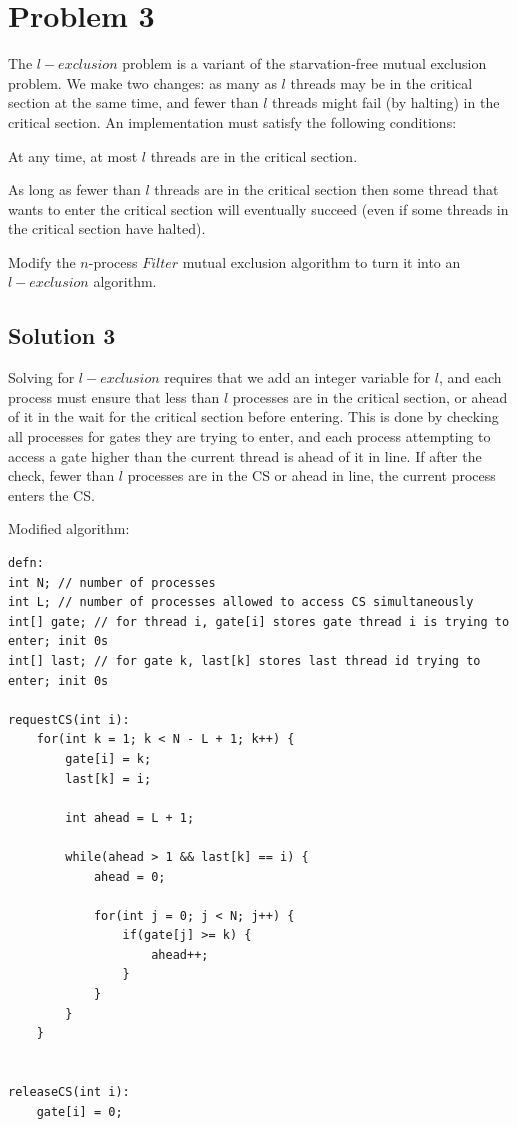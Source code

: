 \documentclass{article}
\begin{document}
\pagebreak
\section{Problem 3}
The $l-exclusion$ problem is a variant of the starvation-free mutual exclusion problem. We make two changes: as many as $l$ threads may be in the critical section at the same time, and fewer than $l$ threads might fail (by halting) in the critical section. An implementation must satisfy the following conditions:

\begin{description}[font=\scshape\bfseries]
\item [$l-Exclusion$:] At any time, at most $l$ threads are in the critical section.
\item [$l-Starvation-Freedom$:] As long as fewer than $l$ threads are in the critical section then some thread that wants to enter the critical section will eventually succeed (even if some threads in the critical section have halted).
\end{description}

Modify the $n$-process $Filter$ mutual exclusion algorithm to turn it into an $l-exclusion$ algorithm.

\subsection{Solution 3}
Solving for $l-exclusion$ requires that we add an integer variable for $l$, and each process must ensure that less than $l$ processes are in the critical section, or ahead of it in the wait for the critical section before entering. This is done by checking all processes for gates they are trying to enter, and each process attempting to access a gate higher than the current thread is ahead of it in line. If after the check, fewer than $l$ processes are in the CS or ahead in line, the current process enters the CS.

Modified algorithm:

\begin{lstlisting}
defn:
int N; // number of processes
int L; // number of processes allowed to access CS simultaneously
int[] gate; // for thread i, gate[i] stores gate thread i is trying to enter; init 0s
int[] last; // for gate k, last[k] stores last thread id trying to enter; init 0s

requestCS(int i):
	for(int k = 1; k < N - L + 1; k++) {
		gate[i] = k;
		last[k] = i;
		
		int ahead = L + 1;
			
		while(ahead > 1 && last[k] == i) {
			ahead = 0;
				
			for(int j = 0; j < N; j++) {
				if(gate[j] >= k) {
					ahead++;
				}
			}
		}
	}

	
releaseCS(int i):
	gate[i] = 0;



\end{lstlisting}
\end{document}
